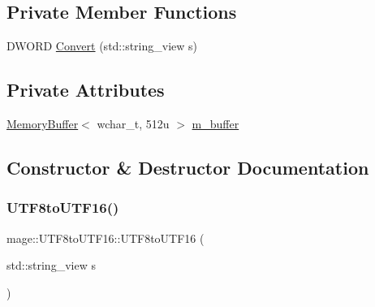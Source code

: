 \subsection*{Private Member Functions}
\begin{DoxyCompactItemize}
\item 
D\+W\+O\+RD \mbox{\hyperlink{classmage_1_1_u_t_f8to_u_t_f16_aa262d527c0f28c2ac8aec0eb0b404398}{Convert}} (std\+::string\+\_\+view s)
\end{DoxyCompactItemize}
\subsection*{Private Attributes}
\begin{DoxyCompactItemize}
\item 
\mbox{\hyperlink{classmage_1_1_memory_buffer}{Memory\+Buffer}}$<$ wchar\+\_\+t, 512u $>$ \mbox{\hyperlink{classmage_1_1_u_t_f8to_u_t_f16_a223961be9fc0502559c3babbce664dcc}{m\+\_\+buffer}}
\end{DoxyCompactItemize}


\subsection{Constructor \& Destructor Documentation}
\mbox{\label{classmage_1_1_u_t_f8to_u_t_f16_a7cfed1091186b2dbc322f03621689d86}} 
\subsubsection{\texorpdfstring{U\+T\+F8to\+U\+T\+F16()}{UTF8toUTF16()}\hspace{0.1cm}{\footnotesize\ttfamily [1/3]}}
{\footnotesize\ttfamily mage\+::\+U\+T\+F8to\+U\+T\+F16\+::\+U\+T\+F8to\+U\+T\+F16 (\begin{DoxyParamCaption}\item[{std\+::string\+\_\+view}]{s }\end{DoxyParamCaption})\hspace{0.3cm}{\ttfamily [explicit]}}

\mbox{\label{classmage_1_1_u_t_f8to_u_t_f16_a90680972e9818f5ce2a6d4df7c71f84e}} 
